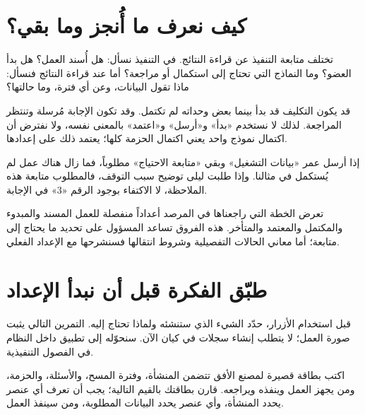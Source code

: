 \section{كيف نعرف ما أُنجز وما بقي؟}
\label{sec:observatory-follow-up}

تختلف متابعة التنفيذ عن قراءة النتائج. في التنفيذ نسأل: هل أُسند العمل؟ هل بدأ العضو؟ وما النماذج التي تحتاج إلى استكمال أو مراجعة؟ أما عند قراءة النتائج فنسأل: ماذا تقول البيانات، وعن أي فترة، وما حالتها؟

قد يكون التكليف قد بدأ بينما بعض وحداته لم تكتمل. وقد تكون الإجابة مُرسلة وتنتظر المراجعة. لذلك لا نستخدم «بدأ» و«أرسل» و«اعتمد» بالمعنى نفسه، ولا نفترض أن اكتمال نموذج واحد يعني اكتمال الحزمة كلها؛ يعتمد ذلك على إعدادها.

\begin{rcnote}
إذا أرسل عمر «بيانات التشغيل» وبقي «متابعة الاحتياج» مطلوباً، فما زال هناك عمل لم يُستكمل في مثالنا. وإذا طلبت ليلى توضيح سبب التوقف، فالمطلوب متابعة هذه الملاحظة، لا الاكتفاء بوجود الرقم «3» في الإجابة.
\end{rcnote}

تعرض الخطة التي راجعناها في المرصد أعداداً منفصلة للعمل المسند والمبدوء والمكتمل والمعتمد والمتأخر. هذه الفروق تساعد المسؤول على تحديد ما يحتاج إلى متابعة؛ أما معاني الحالات التفصيلية وشروط انتقالها فسنشرحها مع الإعداد الفعلي.

\section{طبّق الفكرة قبل أن نبدأ الإعداد}
\label{sec:observatory-exercise}

قبل استخدام الأزرار، حدّد الشيء الذي ستنشئه ولماذا تحتاج إليه. التمرين التالي يثبت صورة العمل؛ لا يتطلب إنشاء سجلات في كيان الآن. سنحوّله إلى تطبيق داخل النظام في الفصول التنفيذية.

\begin{rcnote}
اكتب بطاقة قصيرة لمصنع الأفق تتضمن المنشأة، وفترة المسح، والأسئلة، والحزمة، ومن يجهز العمل وينفذه ويراجعه. قارن بطاقتك بالقيم التالية؛ يجب أن تعرف أي عنصر يحدد المنشأة، وأي عنصر يحدد البيانات المطلوبة، ومن سينفذ العمل.
\end{rcnote}

